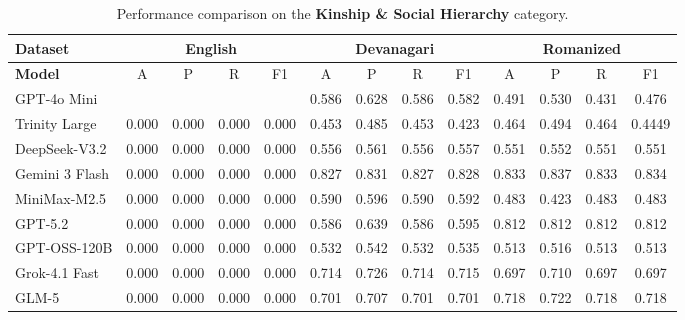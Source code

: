 \documentclass[10pt, a4paper]{article}
\begin{document}
\begin{table}[t]
\centering
\footnotesize
\setlength{\tabcolsep}{4pt}
\renewcommand{\arraystretch}{1.1}

\begin{tabular}{|>{\raggedright\arraybackslash}p{3cm}|cccc|cccc|cccc|}
\hline
\textbf{Dataset}
& \multicolumn{4}{c|}{\textbf{English}}
& \multicolumn{4}{c|}{\textbf{Devanagari}}
& \multicolumn{4}{c|}{\textbf{Romanized}} \\
\hline
\textbf{Model}
& A & P & R & F1 & A & P & R & F1 & A & P & R & F1 \\
\hline
GPT-4o Mini & & & & & 0.586& 0.628& 0.586& 0.582& 0.491& 0.530& 0.431& 0.476\\
\hline
Trinity Large & 0.000 & 0.000 & 0.000 & 0.000 & 0.453& 0.485& 0.453& 0.423& 0.464& 0.494& 0.464& 0.4449\\
\hline
DeepSeek-V3.2 & 0.000 & 0.000 & 0.000 & 0.000 & 0.556& 0.561& 0.556& 0.557& 0.551& 0.552& 0.551& 0.551\\
\hline
Gemini 3 Flash & 0.000 & 0.000 & 0.000 & 0.000 & 0.827& 0.831& 0.827& 0.828& 0.833& 0.837& 0.833& 0.834\\
\hline
MiniMax-M2.5 & 0.000 & 0.000 & 0.000 & 0.000 & 0.590& 0.596& 0.590& 0.592& 0.483& 0.423& 0.483& 0.483\\
\hline
GPT-5.2 & 0.000 & 0.000 & 0.000 & 0.000 & 0.586& 0.639& 0.586& 0.595& 0.812& 0.812& 0.812& 0.812\\
\hline
GPT-OSS-120B & 0.000 & 0.000 & 0.000 & 0.000 & 0.532& 0.542& 0.532& 0.535& 0.513& 0.516& 0.513& 0.513\\
\hline
Grok-4.1 Fast & 0.000 & 0.000 & 0.000 & 0.000 & 0.714& 0.726& 0.714& 0.715& 0.697& 0.710& 0.697& 0.697\\
\hline
GLM-5 & 0.000 & 0.000 & 0.000 & 0.000 & 0.701& 0.707& 0.701& 0.701& 0.718& 0.722& 0.718& 0.718\\
\hline
\end{tabular}
\caption{Performance comparison on the \textbf{Kinship \& Social Hierarchy} category.}
\label{tab:kinship_results}
\end{table}
\end{document}
